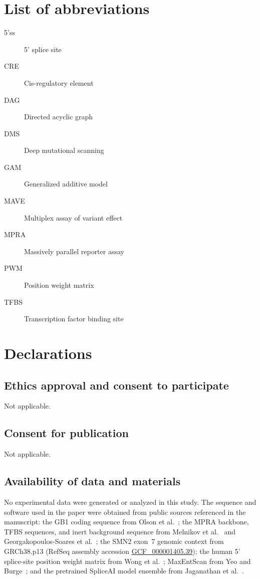\documentclass[pdflatex,sn-vancouver-num,referee,oneside]{sn-jnl}
\begin{document}
\section*{List of abbreviations}
\begin{description}
  \item[5'ss] 5' splice site
  \item[CRE] Cis-regulatory element
  \item[DAG] Directed acyclic graph
  \item[DMS] Deep mutational scanning
  \item[GAM] Generalized additive model
  \item[MAVE] Multiplex assay of variant effect
  \item[MPRA] Massively parallel reporter assay
  \item[PWM] Position weight matrix
  \item[TFBS] Transcription factor binding site
\end{description}

\section*{Declarations}

\subsection*{Ethics approval and consent to participate}
Not applicable.

\subsection*{Consent for publication}
Not applicable.

\subsection*{Availability of data and materials}
No experimental data were generated or analyzed in this study. The sequence and software used in the paper were obtained from public sources referenced in the manuscript: the GB1 coding sequence from Olson et al.~\citep{Olson2014iq}; the MPRA backbone, TFBS sequences, and inert background sequence from Melnikov et al.~\citep{Melnikov2012dw} and Georgakopoulos-Soares et al.~\citep{GeorgakopoulosSoares2023tf}; the SMN2 exon~7 genomic context from GRCh38.p13 (RefSeq assembly accession \href{https://www.ncbi.nlm.nih.gov/datasets/genome/GCF_000001405.39/}{GCF\_000001405.39}); the human 5' splice-site position weight matrix from Wong et al.~\citep{Wong2018quantitative}; MaxEntScan from Yeo and Burge~\citep{Yeo2004me}; and the pretrained SpliceAI model ensemble from Jaganathan et al.~\citep{Jaganathan2019ps}.
\end{document}
